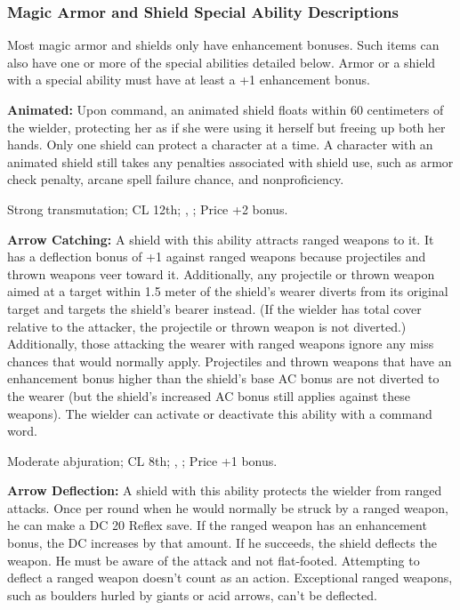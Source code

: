 \subsubsection{Magic Armor and Shield Special Ability Descriptions}
Most magic armor and shields only have enhancement bonuses. Such items can also have one or more of the special abilities detailed below. Armor or a shield with a special ability must have at least a +1 enhancement bonus.

\textbf{Animated:} Upon command, an animated shield floats within 60 centimeters of the wielder, protecting her as if she were using it herself but freeing up both her hands. Only one shield can protect a character at a time. A character with an animated shield still takes any penalties associated with shield use, such as armor check penalty, arcane spell failure chance, and nonproficiency.

Strong transmutation; CL 12th; , ; Price +2 bonus.

\textbf{Arrow Catching:} A shield with this ability attracts ranged weapons to it. It has a deflection bonus of +1 against ranged weapons because projectiles and thrown weapons veer toward it. Additionally, any projectile or thrown weapon aimed at a target within 1.5 meter of the shield's wearer diverts from its original target and targets the shield's bearer instead. (If the wielder has total cover relative to the attacker, the projectile or thrown weapon is not diverted.) Additionally, those attacking the wearer with ranged weapons ignore any miss chances that would normally apply. Projectiles and thrown weapons that have an enhancement bonus higher than the shield's base AC bonus are not diverted to the wearer (but the shield's increased AC bonus still applies against these weapons). The wielder can activate or deactivate this ability with a command word.

Moderate abjuration; CL 8th; , ; Price +1 bonus.

\textbf{Arrow Deflection:} A shield with this ability protects the wielder from ranged attacks. Once per round when he would normally be struck by a ranged weapon, he can make a DC 20 Reflex save. If the ranged weapon has an enhancement bonus, the DC increases by that amount. If he succeeds, the shield deflects the weapon. He must be aware of the attack and not flat-footed. Attempting to deflect a ranged weapon doesn't count as an action. Exceptional ranged weapons, such as boulders hurled by giants or acid arrows, can't be deflected.

